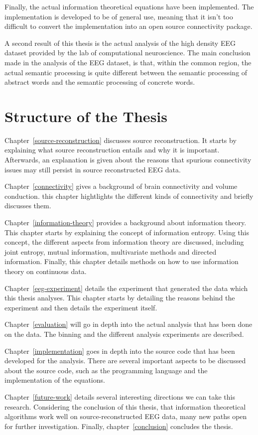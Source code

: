 Finally, the actual information theoretical equations have been implemented. The implementation is developed to be of general use, meaning that it isn't too difficult to convert the implementation into an open source connectivity package.

A second result of this thesis is the actual analysis of the high density EEG dataset provided by the lab of computational neuroscience. The main conclusion made in the analysis of the EEG dataset, is that, within the common region, the actual semantic processing is quite different between the semantic processing of abstract words and the semantic processing of concrete words.

\section{Structure of the Thesis}

Chapter~\ref{source-reconstruction} discusses source reconstruction. It starts by explaining what source reconstruction entails and why it is important. Afterwards, an explanation is given about the reasons that spurious connectivity issues may still persist in source reconstructed EEG data.

Chapter~\ref{connectivity} gives a background of brain connectivity and volume conduction. this chapter hightlights the different kinds of connectivity and briefly discusses them.

Chapter~\ref{information-theory} provides a background about information theory. This chapter starts by explaining the concept of information entropy. Using this concept, the different aspects from information theory are discussed, including joint entropy, mutual information, multivariate methods and directed information. Finally, this chapter details methods on how to use information theory on continuous data.

Chapter~\ref{eeg-experiment} details the experiment that generated the data which this thesis analyses. This chapter starts by detailing the reasons behind the experiment and then details the experiment itself.

Chapter~\ref{evaluation} will go in depth into the actual analysis that has been done on the data. The binning and the different analysis experiments are described. 

Chapter~\ref{implementation} goes in depth into the source code that has been developed for the analysis. There are several important aspects to be discussed about the source code, such as the programming language and the implementation of the equations.

Chapter~\ref{future-work} details several interesting directions we can take this research. Considering the conclusion of this thesis, that information theoretical algorithms work well on source-reconstructed EEG data, many new paths open for further investigation. Finally, chapter~\ref{conclusion} concludes the thesis.